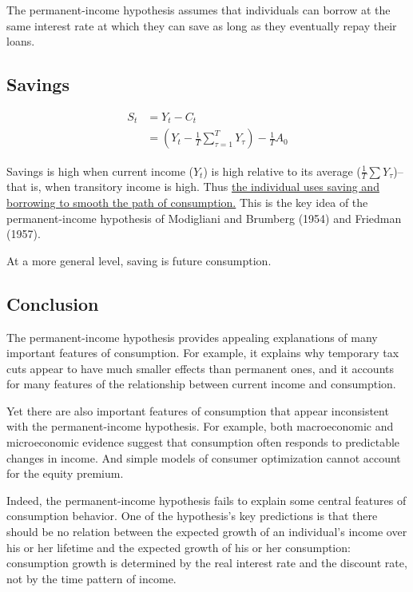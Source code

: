 \documentclass[10pt]{article}
\begin{document}
The permanent-income hypothesis assumes that individuals can borrow at the same interest rate at
which they can save as long as they eventually repay their loans.



\subsection{Savings}
\begin{align}
S_{t} &= Y_{t} - C_{t}\\
&= 
\left( 
		Y_{t} - \frac{1}{T} \sum\limits_{\tau = 1} ^T Y_{\tau}	
\right)  
- \frac{1}{T} A_0 \label{eqn:permanent_income_S}
\end{align}

Savings is high when current income ($ Y_{t} $) is high relative to its average 
($ \frac{1}{T} \sum\limits Y_{\tau}	 $)--that is, when transitory income is high.
Thus {\underline {the individual uses saving and borrowing to smooth the path of consumption.}}
This is the key idea of the permanent-income hypothesis of Modigliani and Brumberg (1954) and
Friedman (1957).

At a more general level, saving is future consumption.




\subsection{Conclusion}
The permanent-income hypothesis provides appealing explanations of many important features of 
consumption. For example, it explains why temporary tax cuts appear to have much smaller
effects than permanent ones, and it accounts for many features of the relationship between current
income and consumption.

Yet there are also important features of consumption that appear inconsistent with the 
permanent-income hypothesis. For example, both macroeconomic and microeconomic evidence suggest
that consumption often responds to predictable changes in income. And simple models of consumer
optimization cannot account for the equity premium.

Indeed, the permanent-income hypothesis fails to explain some central features of consumption
behavior. One of the hypothesis's key predictions is that there should be no relation between the
expected growth of an individual's income over his or her lifetime and the expected growth of
his or her consumption: consumption growth is determined by the real interest rate and the discount
rate, not by the time pattern of income.
\end{document}
